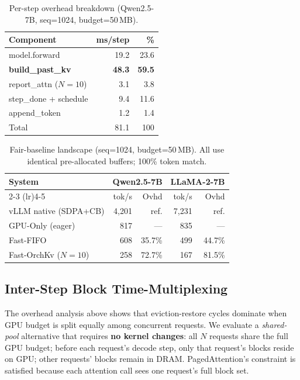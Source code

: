 \documentclass[conference]{IEEEtran}
\begin{document}
\begin{table}[t]
\centering
\caption{Per-step overhead breakdown (Qwen2.5-7B, seq=1024, budget=50\,MB).}
\label{tab:overhead-breakdown}
\small
\setlength{\tabcolsep}{18pt}
\begin{tabular}{@{}lrr@{}}
\toprule
Component & ms/step & \% \\
\midrule
model.forward & 19.2 & 23.6 \\
\textbf{build\_past\_kv} & \textbf{48.3} & \textbf{59.5} \\
report\_attn ($N{=}10$) & 3.1 & 3.8 \\
step\_done + schedule & 9.4 & 11.6 \\
append\_token & 1.2 & 1.4 \\
\midrule
Total & 81.1 & 100 \\
\bottomrule
\end{tabular}
\end{table}

\begin{table}[t]
\centering
\caption{Fair-baseline landscape (seq=1024, budget=50\,MB). All use identical pre-allocated buffers; 100\% token match.}
\label{tab:fair-baseline}
\small
\setlength{\tabcolsep}{6pt}
\begin{tabular}{@{}lrrrr@{}}
\toprule
System & \multicolumn{2}{c}{Qwen2.5-7B} & \multicolumn{2}{c}{LLaMA-2-7B} \\
\cmidrule(lr){2-3} \cmidrule(lr){4-5}
& tok/s & Ovhd & tok/s & Ovhd \\
\midrule
vLLM native (SDPA+CB)  & 4{,}201 & ref. & 7{,}231 & ref. \\
GPU-Only (eager)        & 817 & --- & 835 & --- \\
Fast-FIFO               & 608 & 35.7\% & 499 & 44.7\% \\
Fast-OrchKv ($N{=}10$)  & 258 & 72.7\% & 167 & 81.5\% \\
\bottomrule
\end{tabular}
\end{table}

\subsection{Inter-Step Block Time-Multiplexing}
\label{sec:time-multiplex}

The overhead analysis above shows that eviction-restore cycles dominate when GPU budget is split equally among concurrent requests. We evaluate a \emph{shared-pool} alternative that requires \textbf{no kernel changes}: all $N$ requests share the full GPU budget; before each request's decode step, only that request's blocks reside on GPU; other requests' blocks remain in DRAM. PagedAttention's constraint is satisfied because each attention call sees one request's full block set.
\end{document}
